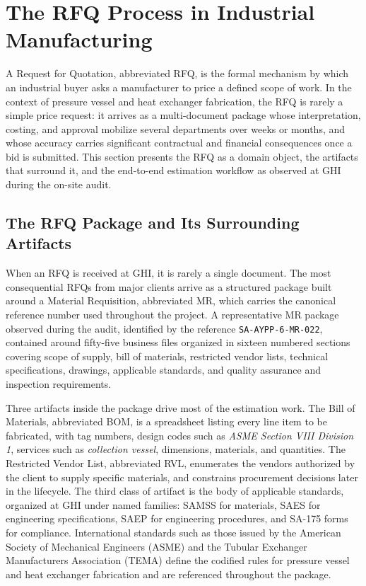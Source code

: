 \section{The RFQ Process in Industrial Manufacturing}
A Request for Quotation, abbreviated RFQ, is the formal mechanism by which an industrial buyer asks a manufacturer to price a defined scope of work. In the context of pressure vessel and heat exchanger fabrication, the RFQ is rarely a simple price request: it arrives as a multi-document package whose interpretation, costing, and approval mobilize several departments over weeks or months, and whose accuracy carries significant contractual and financial consequences once a bid is submitted. This section presents the RFQ as a domain object, the artifacts that surround it, and the end-to-end estimation workflow as observed at GHI during the on-site audit.

\subsection*{The RFQ Package and Its Surrounding Artifacts}
When an RFQ is received at GHI, it is rarely a single document. The most consequential RFQs from major clients arrive as a structured package built around a Material Requisition, abbreviated MR, which carries the canonical reference number used throughout the project. A representative MR package observed during the audit, identified by the reference \texttt{SA-AYPP-6-MR-022}, contained around fifty-five business files organized in sixteen numbered sections covering scope of supply, bill of materials, restricted vendor lists, technical specifications, drawings, applicable standards, and quality assurance and inspection requirements.

Three artifacts inside the package drive most of the estimation work. The Bill of Materials, abbreviated BOM, is a spreadsheet listing every line item to be fabricated, with tag numbers, design codes such as \textit{ASME Section VIII Division 1}, services such as \textit{collection vessel}, dimensions, materials, and quantities. The Restricted Vendor List, abbreviated RVL, enumerates the vendors authorized by the client to supply specific materials, and constrains procurement decisions later in the lifecycle. The third class of artifact is the body of applicable standards, organized at GHI under named families: SAMSS for materials, SAES for engineering specifications, SAEP for engineering procedures, and SA-175 forms for compliance. International standards such as those issued by the American Society of Mechanical Engineers (ASME) and the Tubular Exchanger Manufacturers Association (TEMA) define the codified rules for pressure vessel and heat exchanger fabrication and are referenced throughout the package.

